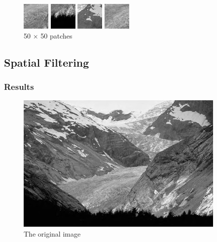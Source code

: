 \documentclass{article}
\begin{document}
\begin{figure}[H]
	\begin{minipage}[b]{0.24\linewidth}
		\centering
		\includegraphics[width=37.5pt]{../result/patch-50-50-4.png}
	\end{minipage}
	\begin{minipage}[b]{0.24\linewidth}
		\centering
		\includegraphics[width=37.5pt]{../result/patch-50-50-5.png}
	\end{minipage}
	\begin{minipage}[b]{0.24\linewidth}
		\centering
		\includegraphics[width=37.5pt]{../result/patch-50-50-6.png}
	\end{minipage}
	\begin{minipage}[b]{0.24\linewidth}
		\centering
		\includegraphics[width=37.5pt]{../result/patch-50-50-7.png}
	\end{minipage}
	\caption{50 $\times$ 50 patches}
\end{figure}

\subsection{Spatial Filtering}

\subsubsection{Results}

\begin{figure}[H]
	\centering
	\includegraphics[width=288pt]{../img/02.png}
	\caption{The original image}
\end{figure}
\end{document}
